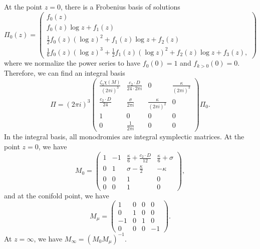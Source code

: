 \documentclass[10pt]{amsart}
\theoremstyle{definition}
\theoremstyle{remark}
\theoremstyle{plain}
\theoremstyle{definition}
\theoremstyle{remark}
\newcommand{\1}{\mathbf{1}}
\newcommand{\2}{\mathbf{2}}
\newcommand{\3}{\mathbf{3}}
\begin{document}
At the point $z=0$, there is a Frobenius basis of solutions
\[ \Pi_0(z) = \begin{pmatrix}
    f_0(z) \\
    f_0(z) \log z + f_1(z) \\
    \frac{1}{2}f_0(z) (\log z)^2 + f_1(z) \log z + f_2(z) \\
    \frac{1}{6} f_0(z) (\log z)^3 + \frac{1}{2} f_1(z) (\log z)^2 + f_2(z)\log z + f_3 (z),
\end{pmatrix}
\]
where we normalize the power series to have $f_0(0) = 1$ and $f_{k>0}(0) = 0$. Therefore, we can find an integral basis
\[ \Pi = (2\pi i)^3 \begin{pmatrix}
    \frac{\zeta_3 \chi(M)}{(2\pi i)^3} & \frac{c_2 \cdot D}{24 \cdot 2\pi i} & 0 & \frac{\kappa}{(2\pi i)^3} \\
    \frac{c_2 \cdot D}{24} & \frac{\sigma}{2\pi i} & \frac{\kappa}{(2\pi i)^2} & 0 \\
    1 & 0 & 0 & 0 \\
    0 & \frac{1}{2\pi i} & 0 & 0
\end{pmatrix} \Pi_0.
\]
In the integral basis, all monodromies are integral symplectic matrices. At the point $z=0$, we have
\[ M_0 = \begin{pmatrix}
    1 & -1 & \frac{\kappa}{6} + \frac{c_2 \cdot D}{12} & \frac{\kappa}{6} + \sigma \\
    0 & 1 & \sigma - \frac{\kappa}{2} & -\kappa \\
    0 & 0 & 1 & 0 \\
    0 & 0 & 1 & 0
\end{pmatrix},
\]
and at the conifold point, we have
\[ M_{\mu} = \begin{pmatrix}
    1 & 0 & 0 & 0 \\
    0 & 1 & 0 & 0 \\
    -1 & 0 & 1 & 0 \\
    0 & 0 & 0 & -1
\end{pmatrix}.
\]
At $z=\infty$, we have $M_{\infty} = (M_0 M_{\mu})^{-1}$.
\end{document}
